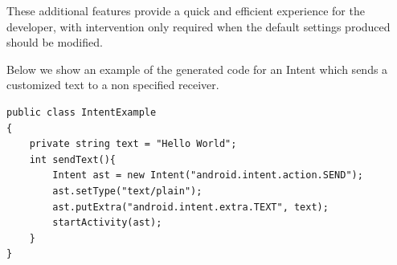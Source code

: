 These additional features provide a quick and efficient experience for the developer, with intervention only required when the default settings produced should be modified.

Below we show an example of the generated code for an Intent which sends a customized text to a non specified receiver.

{\footnotesize\begin{lstlisting}
public class IntentExample
{
	private string text = "Hello World";
	int sendText(){
		Intent ast = new Intent("android.intent.action.SEND");
		ast.setType("text/plain");
		ast.putExtra("android.intent.extra.TEXT", text);
		startActivity(ast);		
	}
}
\end{lstlisting}}
